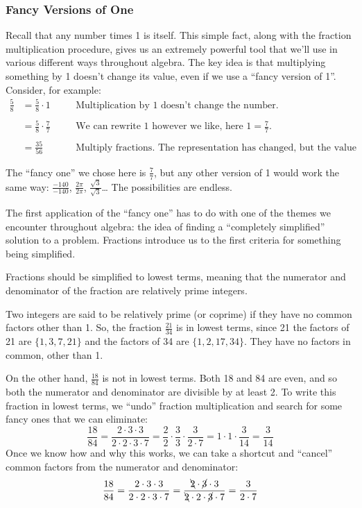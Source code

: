 \subsubsection*{Fancy Versions of One}

Recall that any number times 1 is itself. This simple fact, along with the fraction multiplication procedure, gives us an extremely powerful tool that we'll use in various different ways throughout algebra. The key idea is that multiplying something by 1 doesn't change its value, even if we use a ``fancy version of 1''. Consider, for example:
\[\begin{aligned}
\frac{5}{8} &= \frac{5}{8} \cdot 1
&& \quad\text{Multiplication by 1 doesn't change the number.}
\\
\\
&= \frac{5}{8} \cdot \frac{7}{7}
&& \quad\text{We can rewrite 1 however we like, here $1 = \frac{7}{7}$.}
\\
\\
&= \frac{35}{56}
&& \quad\text{Multiply fractions. The representation has changed, but the value is the same!}
\end{aligned}\]

The ``fancy one'' we chose here is $\frac{7}{7}$, but any other version of 1 would work the same way: $\frac{-140}{-140}$, $\frac{2\pi}{2\pi}$, $\frac{\sqrt3}{\sqrt3}$\ldots{} The possibilities are endless.

The first application of the ``fancy one'' has to do with one of the themes we encounter throughout algebra: the idea of finding a ``completely simplified'' solution to a problem. Fractions introduce us to the first criteria for something being simplified.

\begin{boxedcriteria}
Fractions should be simplified to \gls{lowest terms}, meaning that the numerator and denominator of the fraction are \gls{relatively prime} integers.
\end{boxedcriteria}

Two integers are said to be relatively prime (or coprime) if they have no common factors other than 1. So, the fraction $\frac{21}{34}$ is in lowest terms, since 21 the factors of 21 are $\{1, 3, 7, 21\}$ and the factors of 34 are $\{1, 2, 17, 34\}$. They have no factors in common, other than 1.

On the other hand, $\frac{18}{84}$ is not in lowest terms. Both 18 and 84 are even, and so both the numerator and denominator are divisible by at least 2. To write this fraction in lowest terms, we ``undo'' fraction multiplication and search for some fancy ones that we can eliminate: \[\frac{18}{84} = \frac{2 \cdot 3 \cdot 3}{2 \cdot 2 \cdot 3 \cdot 7}  = \frac{2}{2}\cdot\frac{3}{3}\cdot\frac{3}{2\cdot 7} = 1\cdot1\cdot\frac{3}{14} = \frac{3}{14}\]
Once we know how and why this works, we can take a shortcut and ``cancel'' common factors from the numerator and denominator: \[\frac{18}{84} = \frac{2 \cdot 3 \cdot 3}{2 \cdot 2 \cdot 3 \cdot 7}=\frac{\bcancel{2} \cdot \cancel{3} \cdot 3}{\bcancel{2} \cdot 2 \cdot \cancel{3} \cdot 7}  = \frac{3}{2 \cdot 7}\]

